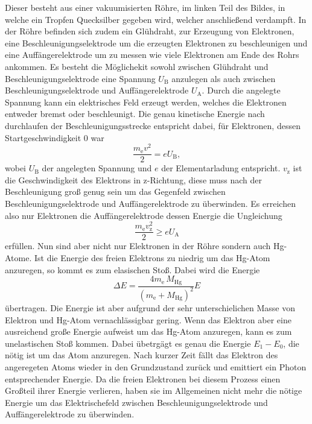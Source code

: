 Dieser besteht aus einer vakuumisierten Röhre, im linken Teil des Bildes, in welche ein Tropfen Quecksilber gegeben wird, welcher anschließend verdampft.
In der Röhre befinden sich zudem ein Glühdraht, zur Erzeugung von Elektronen, eine Beschleunigungselektrode um die erzeugten Elektronen zu beschleunigen und eine Auffängerelektrode um zu messen wie viele Elektronen am Ende des Rohrs ankommen.
Es besteht die Möglichekit sowohl zwischen Glühdraht und Beschleunigungselektrode eine Spannung $U_\text{B}$ anzulegen als auch zwischen Beschleunigungselektrode und Auffängerelektrode $U_\text{A}$.
Durch die angelegte Spannung kann ein elektrisches Feld erzeugt werden, welches die Elektronen entweder bremst oder beschleunigt.
Die genau kinetische Energie nach durchlaufen der Beschleunigungsstrecke entspricht dabei, für Elektronen, dessen Startgeschwindigkeit 0 war
\begin{equation}
    \frac{m_\text{e} v^2}{2} = eU_\text{B},
    \label{eq:Energieelek}
\end{equation}
wobei $U_\text{B}$ der angelegten Spannung und $e$ der Elementarladung entspricht.
$v_\text{z}$ ist die Geschwindigkeit des Elektrons in z-Richtung, diese muss nach der Beschleunigung groß genug sein um das Gegenfeld zwischen Beschleunigungselektrode und Auffängerelektrode zu überwinden.
Es erreichen also nur Elektronen die Auffängerelektrode dessen Energie die Ungleichung
\begin{equation*}
    \frac{m_\text{e} v_\text{z}^2}{2} \geq eU_\text{A} 
\end{equation*}
erfüllen.
Nun sind aber nicht nur Elektronen in der Röhre sondern auch Hg-Atome.
Ist die Energie des freien Elektrons zu niedrig um das Hg-Atom anzuregen, so kommt es zum elasischen Stoß.
Dabei wird die Energie 
\begin{equation*}
    \Delta E = \frac{4m_\text{e}\, M_\text{Hg}}{\left (m_\text{e} + M_\text{Hg} \right )^2} E
\end{equation*}
übertragen.
Die Energie ist aber aufgrund der sehr unterschielichen Masse von Elektron und Hg-Atom vernachlässigbar gering.
Wenn das Elektron aber eine ausreichend große Energie aufweist um das Hg-Atom anzuregen, kann es zum unelastischen Stoß kommen.
Dabei übetrgägt es genau die Energie $E_1 - E_0$, die nötig ist um das Atom anzuregen.
Nach kurzer Zeit fällt das Elektron des angeregeten Atoms wieder in den Grundzustand zurück und emittiert ein Photon entsprechender Energie.
Da die freien Elektronen bei diesem Prozess einen Großteil ihrer Energie verlieren, haben sie im Allgemeinen nicht mehr die nötige Energie um das Elektrischefeld zwischen Beschleunigungselektrode und Auffängerelektrode zu überwinden.
